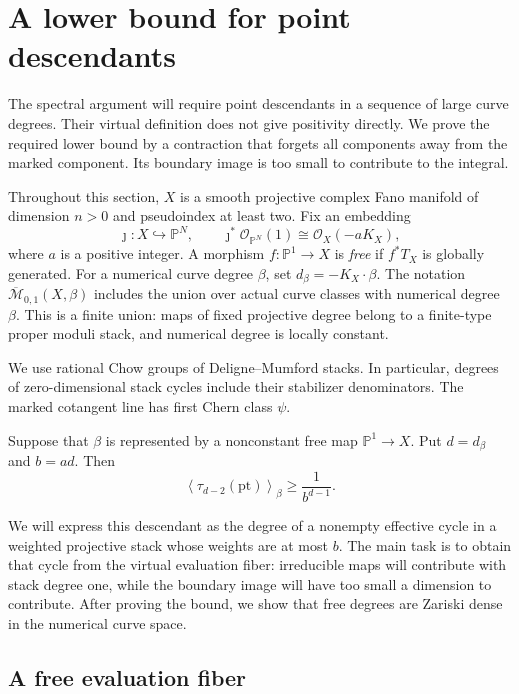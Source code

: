 \section{A lower bound for point descendants}
\label{sec:descendants}

The spectral argument will require point descendants in a sequence of
large curve degrees.  Their virtual definition does not give positivity
directly.  We prove the required lower bound by a contraction that forgets
all components away from the marked component.  Its boundary image is too
small to contribute to the integral.

Throughout this section, \(X\) is a smooth projective complex Fano manifold
of dimension \(n>0\) and pseudoindex at least two.  Fix an embedding
\[
  \jmath:X\hookrightarrow\mathbb P^N,\qquad
  \jmath^*\mathcal O_{\mathbb P^N}(1)\cong\mathcal O_X(-aK_X),
\]
where \(a\) is a positive integer.  A morphism
\(f:\mathbb P^1\to X\) is \emph{free} if \(f^*T_X\) is globally generated.
For a numerical curve degree \(\beta\), set \(d_\beta=-K_X\cdot\beta\).
The notation \(\overline{\mathcal M}_{0,1}(X,\beta)\) includes the union
over actual curve classes with numerical degree \(\beta\).  This is a
finite union: maps of fixed projective degree belong to a finite-type
proper moduli stack, and numerical degree is locally constant.

We use rational Chow groups of Deligne--Mumford stacks.  In particular,
degrees of zero-dimensional stack cycles include their stabilizer
denominators.  The marked cotangent line has first Chern class \(\psi\).

\begin{proposition}
\label{prop:descendant-bound}
Suppose that \(\beta\) is represented by a nonconstant free map
\(\mathbb P^1\to X\).  Put \(d=d_\beta\) and \(b=ad\).  Then
\[
  \left\langle\tau_{d-2}(\mathrm{pt})\right\rangle_\beta
  \ge \frac{1}{b^{d-1}}.
\]
\end{proposition}

We will express this descendant as the degree of a nonempty effective
cycle in a weighted projective stack whose weights are at most \(b\).
The main task is to obtain that cycle from the virtual evaluation
fiber: irreducible maps will contribute with stack degree one, while
the boundary image will have too small a dimension to contribute.
After proving the bound, we show that free degrees are Zariski dense
in the numerical curve space.

\subsection{A free evaluation fiber}

